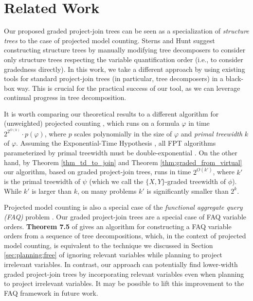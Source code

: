 \section{Related Work}

Our proposed graded project-join trees can be seen as a specialization of \emph{structure trees} \cite{stearns2002exploiting} to the case of projected model counting. Sterns and Hunt \cite{stearns2002exploiting} suggest constructing structure trees by manually modifying tree decomposers to consider only structure trees respecting the variable quantification order (i.e., to consider gradedness directly). In this work, we take a different approach by using existing tools for standard project-join trees (in particular, tree decomposers) in a black-box way. This is crucial for the practical success of our tool, as we can leverage continual progress in tree decomposition. 

It is worth comparing our theoretical results to a different algorithm for (unweighted) projected counting \cite{fichte2018exploiting}, which runs on a formula $\varphi$ in time $2^{2^{O(k)}} \cdot p(\varphi)$, where $p$ scales polynomially in the size of $\varphi$ and \emph{primal treewidth} \cite{SS10} $k$ of $\varphi$. Assuming the Exponential-Time Hypothesis \cite{impagliazzo2001problems}, all FPT algorithms parameterized by primal treewidth must be double-exponential \cite{fichte2018exploiting}. 
On the other hand, by Theorem \ref{thm_td_to_join} and Theorem \ref{thm:graded_from_virtual} our algorithm, based on graded project-join trees, runs in time $2^{O(k')}$, where $k'$ is the primal treewidth of $\psi$ (which we call the $\{X,Y\}$-graded treewidth of $\phi$). While $k'$ is larger than $k$, on many problems $k'$ is significantly smaller than $2^k$. 

Projected model counting is also a special case of the \emph{functional aggregate query (FAQ)} problem \cite{KNR16}. Our graded project-join trees are a special case of FAQ variable orders. \textbf{Theorem 7.5} of \cite{KNR16} gives an algorithm for constructing a FAQ variable orders from a sequence of tree decompositions, which, in the context of projected model counting, is equivalent to the technique we discussed in Section \ref{sec:planning:free} of ignoring relevant variables while planning to project irrelevant variables. In contrast, our approach can potentially find lower-width graded project-join trees by incorporating relevant variables even when planning to project irrelevant variables. It may be possible to lift this improvement to the FAQ framework in future work.

